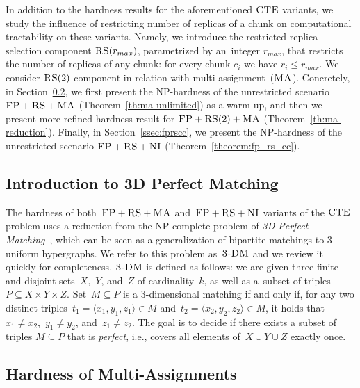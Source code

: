 In addition to the hardness results for the aforementioned $\textsc{CTE}$ variants, we study the influence of restricting number of replicas of a chunk on computational tractability on these variants.
Namely, we introduce the restricted replica selection component $\textsc{RS}(r_{max})$, parametrized by an~integer $r_{max}$, that restricts the number of replicas of any chunk: for every chunk $c_i$ we have $r_i \leq r_{max}$.
We consider $\textsc{RS}(2)$ component in relation with multi-assignment~($\textsc{MA}$).
Concretely, in Section~\ref{ssec:fprsma}, we first present the NP-hardness of the unrestricted scenario $\textsc{FP}+\textsc{RS}+\textsc{MA}$ (Theorem~\ref{th:ma-unlimited}) as a warm-up,
and then we present more refined hardness result for ${\textsc{FP}+\textsc{RS}(2)+\textsc{MA}}$ (Theorem~\ref{th:ma-reduction}).
Finally, in Section~\ref{ssec:fprscc}, we present the NP-hardness of the unrestricted scenario $\textsc{FP}+\textsc{RS}+\textsc{NI}$ (Theorem~\ref{theorem:fp_rs_cc}).

\subsection{Introduction to 3D Perfect Matching}
\label{sec:3dm_intro}

The hardness of both~$\textsc{FP}+\textsc{RS}+\textsc{MA}$ and~$\textsc{FP}+\textsc{RS}+\textsc{NI}$ variants of the $\textsc{CTE}$ problem uses a reduction
from the NP-complete problem of \emph{3D Perfect Matching}~\cite{3dmatch},
which can be seen as a generalization of bipartite matchings to 3-uniform
hypergraphs. We refer to this problem as~$\textsc{3-DM}$ and we
review it quickly for completeness.
$\textsc{3-DM}$ is defined as follows: we are given three finite and disjoint
sets~$X$,~$Y$, and~$Z$ of cardinality~$k$, as well as a~subset of triples~$P\subseteq
X \times Y \times Z$.  Set~$M \subseteq P$ is a 3-dimensional matching
if and only if, for any two distinct triples~$t_1=\langle x_1, y_1, z_1\rangle \in M$
and~$t_2= \langle x_2, y_2, z_2 \rangle \in M$, it holds that~$x_1\neq x_2$,~$y_1\neq
y_2$, and~$z_1\neq z_2$. The goal is to decide if there exists
a subset of triples $M \subseteq P$ that is \emph{perfect}, i.e., covers all
elements of~$X \cup Y \cup Z$ exactly once.


\subsection{Hardness of Multi-Assignments}\label{ssec:fprsma}

